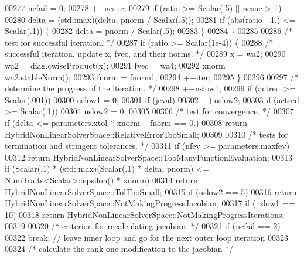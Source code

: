 \begin{DoxyCode}
00277             ncfail = 0;
00278             ++ncsuc;
00279             \textcolor{keywordflow}{if} (ratio >= Scalar(.5) || ncsuc > 1)
00280                 delta = (std::max)(delta, pnorm / Scalar(.5));
00281             \textcolor{keywordflow}{if} (abs(ratio - 1.) <= Scalar(.1)) \{
00282                 delta = pnorm / Scalar(.5);
00283             \}
00284         \}
00285 
00286         \textcolor{comment}{/* test for successful iteration. */}
00287         \textcolor{keywordflow}{if} (ratio >= Scalar(1e-4)) \{
00288             \textcolor{comment}{/* successful iteration. update x, fvec, and their norms. */}
00289             x = wa2;
00290             wa2 = diag.cwiseProduct(x);
00291             fvec = wa4;
00292             xnorm = wa2.stableNorm();
00293             fnorm = fnorm1;
00294             ++iter;
00295         \}
00296 
00297         \textcolor{comment}{/* determine the progress of the iteration. */}
00298         ++nslow1;
00299         \textcolor{keywordflow}{if} (actred >= Scalar(.001))
00300             nslow1 = 0;
00301         \textcolor{keywordflow}{if} (jeval)
00302             ++nslow2;
00303         \textcolor{keywordflow}{if} (actred >= Scalar(.1))
00304             nslow2 = 0;
00305 
00306         \textcolor{comment}{/* test for convergence. */}
00307         \textcolor{keywordflow}{if} (delta <= parameters.xtol * xnorm || fnorm == 0.)
00308             \textcolor{keywordflow}{return} HybridNonLinearSolverSpace::RelativeErrorTooSmall;
00309 
00310         \textcolor{comment}{/* tests for termination and stringent tolerances. */}
00311         \textcolor{keywordflow}{if} (nfev >= parameters.maxfev)
00312             \textcolor{keywordflow}{return} HybridNonLinearSolverSpace::TooManyFunctionEvaluation;
00313         \textcolor{keywordflow}{if} (Scalar(.1) * (std::max)(Scalar(.1) * delta, pnorm) <= NumTraits<Scalar>::epsilon() * xnorm)
00314             \textcolor{keywordflow}{return} HybridNonLinearSolverSpace::TolTooSmall;
00315         \textcolor{keywordflow}{if} (nslow2 == 5)
00316             \textcolor{keywordflow}{return} HybridNonLinearSolverSpace::NotMakingProgressJacobian;
00317         \textcolor{keywordflow}{if} (nslow1 == 10)
00318             \textcolor{keywordflow}{return} HybridNonLinearSolverSpace::NotMakingProgressIterations;
00319 
00320         \textcolor{comment}{/* criterion for recalculating jacobian. */}
00321         \textcolor{keywordflow}{if} (ncfail == 2)
00322             \textcolor{keywordflow}{break}; \textcolor{comment}{// leave inner loop and go for the next outer loop iteration}
00323 
00324         \textcolor{comment}{/* calculate the rank one modification to the jacobian */}

\end{DoxyCode}
